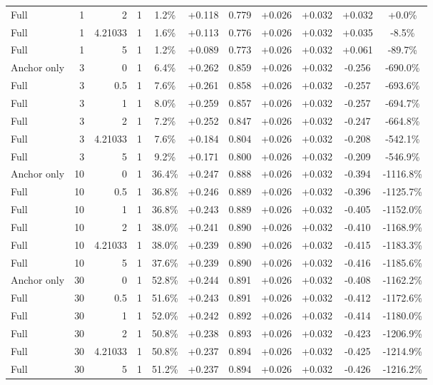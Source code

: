 \begin{table}[htbp]
\begin{tabular}{lrrrccccccc}
Full & 1 & 2 & 1 & 1.2\% & +0.118 & 0.779 & +0.026 & +0.032 & +0.032 & +0.0\% \\
Full & 1 & 4.21033 & 1 & 1.6\% & +0.113 & 0.776 & +0.026 & +0.032 & +0.035 & -8.5\% \\
Full & 1 & 5 & 1 & 1.2\% & +0.089 & 0.773 & +0.026 & +0.032 & +0.061 & -89.7\% \\
Anchor only & 3 & 0 & 1 & 6.4\% & +0.262 & 0.859 & +0.026 & +0.032 & -0.256 & -690.0\% \\
Full & 3 & 0.5 & 1 & 7.6\% & +0.261 & 0.858 & +0.026 & +0.032 & -0.257 & -693.6\% \\
Full & 3 & 1 & 1 & 8.0\% & +0.259 & 0.857 & +0.026 & +0.032 & -0.257 & -694.7\% \\
Full & 3 & 2 & 1 & 7.2\% & +0.252 & 0.847 & +0.026 & +0.032 & -0.247 & -664.8\% \\
Full & 3 & 4.21033 & 1 & 7.6\% & +0.184 & 0.804 & +0.026 & +0.032 & -0.208 & -542.1\% \\
Full & 3 & 5 & 1 & 9.2\% & +0.171 & 0.800 & +0.026 & +0.032 & -0.209 & -546.9\% \\
Anchor only & 10 & 0 & 1 & 36.4\% & +0.247 & 0.888 & +0.026 & +0.032 & -0.394 & -1116.8\% \\
Full & 10 & 0.5 & 1 & 36.8\% & +0.246 & 0.889 & +0.026 & +0.032 & -0.396 & -1125.7\% \\
Full & 10 & 1 & 1 & 36.8\% & +0.243 & 0.889 & +0.026 & +0.032 & -0.405 & -1152.0\% \\
Full & 10 & 2 & 1 & 38.0\% & +0.241 & 0.890 & +0.026 & +0.032 & -0.410 & -1168.9\% \\
Full & 10 & 4.21033 & 1 & 38.0\% & +0.239 & 0.890 & +0.026 & +0.032 & -0.415 & -1183.3\% \\
Full & 10 & 5 & 1 & 37.6\% & +0.239 & 0.890 & +0.026 & +0.032 & -0.416 & -1185.6\% \\
Anchor only & 30 & 0 & 1 & 52.8\% & +0.244 & 0.891 & +0.026 & +0.032 & -0.408 & -1162.2\% \\
Full & 30 & 0.5 & 1 & 51.6\% & +0.243 & 0.891 & +0.026 & +0.032 & -0.412 & -1172.6\% \\
Full & 30 & 1 & 1 & 52.0\% & +0.242 & 0.892 & +0.026 & +0.032 & -0.414 & -1180.0\% \\
Full & 30 & 2 & 1 & 50.8\% & +0.238 & 0.893 & +0.026 & +0.032 & -0.423 & -1206.9\% \\
Full & 30 & 4.21033 & 1 & 50.8\% & +0.237 & 0.894 & +0.026 & +0.032 & -0.425 & -1214.9\% \\
Full & 30 & 5 & 1 & 51.2\% & +0.237 & 0.894 & +0.026 & +0.032 & -0.426 & -1216.2\% \\

\end{tabular}
\end{table}
